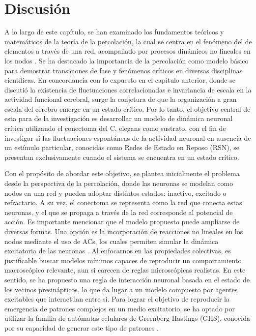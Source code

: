  
 
 
 

\section{Discusión}



A lo largo de este capítulo, se han examinado los fundamentos teóricos y matemáticos  de la teoría de la percolación, la cual se centra en el fenómeno del  de elementos a través de una red, acompañado por procesos dinámicos no lineales en los nodos \cite{bagnoli_percolation_2019}. Se ha destacado la importancia de la percolación como modelo básico para demostrar transiciones de fase y fenómenos críticos en diversas disciplinas científicas.  En concordancia con lo expuesto en el capítulo anterior, donde se discutió la existencia de fluctuaciones correlacionadas e invariancia de escala en la actividad funcional cerebral, surge la conjetura de que la organización a gran escala del cerebro emerge en un estado crítico. Por lo tanto, el objetivo central de esta para de la investigación es desarrollar un modelo de dinámica neuronal crítica utilizando el conectoma del C. elegans como sustrato, con el fin de investigar si las fluctuaciones espontáneas de la actividad neuronal en ausencia de un estímulo particular, conocidas como Redes de Estado en Reposo (RSN), se presentan exclusivamente cuando el sistema se encuentra en un estado crítico.

Con el propósito de abordar este objetivo, se plantea inicialmente el problema desde la perspectiva de la percolación, donde las neuronas se modelan como nodos en una red y pueden adoptar distintos estados: inactivo, excitado o refractario. A su vez, el conectoma se representa como la red que conecta estas neuronas, y el    que se propaga a través de la red corresponde al potencial de acción. Es importante mencionar que el modelo propuesto puede ampliarse de diversas formas. Una opción es la incorporación de reacciones no lineales en los nodos mediante el uso de \glspl{AC}, los cuales permiten simular la dinámica excitatoria de las neuronas \cite{hartarsky_bootstrap_2022}. Al enfocarnos en las propiedades colectivas, es justificable buscar modelos mínimos capaces de reproducir un comportamiento macroscópico relevante, aun si carecen de reglas microscópicas realistas. En este sentido, se ha propuesto una regla de interacción neuronal basada en el estado de los vecinos presinápticos, lo que da lugar a un modelo compuesto por agentes excitables que interactúan entre sí. Para lograr el objetivo de reproducir la emergencia de patrones complejos en un medio excitatorio, se ha optado por utilizar la familia de autómatas celulares de Greenberg-Hastings (GHS), conocida por su capacidad de generar este tipo de patrones \cite{greenberg_spatial_1978}.

